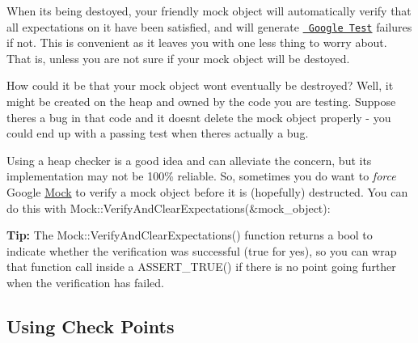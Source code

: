 When it\textquotesingle{}s being destoyed, your friendly mock object will automatically verify that all expectations on it have been satisfied, and will generate \href{http://code.google.com/p/googletest/}\texttt{ Google Test} failures if not. This is convenient as it leaves you with one less thing to worry about. That is, unless you are not sure if your mock object will be destoyed.

How could it be that your mock object won\textquotesingle{}t eventually be destroyed? Well, it might be created on the heap and owned by the code you are testing. Suppose there\textquotesingle{}s a bug in that code and it doesn\textquotesingle{}t delete the mock object properly -\/ you could end up with a passing test when there\textquotesingle{}s actually a bug.

Using a heap checker is a good idea and can alleviate the concern, but its implementation may not be 100\% reliable. So, sometimes you do want to {\itshape force} Google \mbox{\hyperlink{class_mock}{Mock}} to verify a mock object before it is (hopefully) destructed. You can do this with {\ttfamily Mock\+::\+Verify\+And\+Clear\+Expectations(\&mock\+\_\+object)}\+:


\begin{DoxyCode}{0}
\DoxyCodeLine{}
\DoxyCodeLine{}
\DoxyCodeLine{}
\end{DoxyCode}


{\bfseries{Tip\+:}} The {\ttfamily Mock\+::\+Verify\+And\+Clear\+Expectations()} function returns a {\ttfamily bool} to indicate whether the verification was successful ({\ttfamily true} for yes), so you can wrap that function call inside a {\ttfamily A\+S\+S\+E\+R\+T\+\_\+\+T\+R\+U\+E()} if there is no point going further when the verification has failed.

\subsection*{Using Check Points}

